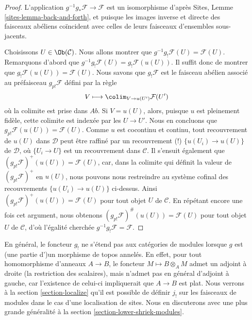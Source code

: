 \begin{proof}
L'application $g^{-1}g_*\mathcal{F} \to \mathcal{F}$ est un isomorphisme
d'après Sites, Lemme \ref{sites-lemma-back-and-forth}, et puisque les images
inverse et directe des faisceaux abéliens coïncident avec celles de leurs
faisceaux d'ensembles sous-jacents.

\medskip\noindent
Choisissons $U \in \Ob(\mathcal{C})$. Nous allons montrer que
$g^{-1}g_!\mathcal{F}(U) = \mathcal{F}(U)$. Remarquons d'abord que
$g^{-1}g_!\mathcal{F}(U) = g_!\mathcal{F}(u(U))$. Il suffit donc de montrer que
$g_!\mathcal{F}(u(U)) = \mathcal{F}(U)$. Nous savons que $g_!\mathcal{F}$ est
le faisceau abélien associé au préfaisceau $g_{p!}\mathcal{F}$ défini par la
règle
$$
V \longmapsto \colim_{V \to u(U')} \mathcal{F}(U')
$$
où la colimite est prise dans $\textit{Ab}$. Si $V = u(U)$, alors, puisque $u$
est pleinement fidèle, cette colimite est indexée par les $U \to U'$. Nous en
concluons que $g_{p!}\mathcal{F}(u(U)) = \mathcal{F}(U)$. Comme $u$ est
cocontinu et continu, tout recouvrement de $u(U)$ dans $\mathcal{D}$ peut être
raffiné par un recouvrement (!) $\{u(U_i) \to u(U)\}$ de $\mathcal{D}$, où
$\{U_i \to U\}$ est un recouvrement dans $\mathcal{C}$. Il s'ensuit également
que $(g_{p!}\mathcal{F})^+(u(U)) = \mathcal{F}(U)$, car, dans la colimite qui
définit la valeur de $(g_{p!}\mathcal{F})^+$ en $u(U)$, nous pouvons nous
restreindre au système cofinal des recouvrements
$\{u(U_i) \to u(U)\}$ ci-dessus. Ainsi
$(g_{p!}\mathcal{F})^+(u(U)) = \mathcal{F}(U)$ pour tout objet $U$ de
$\mathcal{C}$. En répétant encore une fois cet argument, nous obtenons
$(g_{p!}\mathcal{F})^\#(u(U)) = \mathcal{F}(U)$ pour tout objet $U$ de
$\mathcal{C}$, d'où l'égalité cherchée $g^{-1}g_!\mathcal{F} = \mathcal{F}$.
\end{proof}

\begin{remark}
\label{remark-no-extension}
En général, le foncteur $g_!$ ne s'étend pas aux catégories de modules lorsque
$g$ est (une partie d')un morphisme de topos annelés. En effet, pour tout
homomorphisme d'anneaux $A \to B$, le foncteur
$M \mapsto B \otimes_A M$ admet un adjoint à droite (la restriction des
scalaires), mais n'admet pas en général d'adjoint à gauche, car l'existence de
celui-ci impliquerait que $A \to B$ est plat. Nous verrons à la section
\ref{section-localize} qu'il est possible de définir $j_!$ sur les faisceaux de
modules dans le cas d'une localisation de sites. Nous en discuterons avec une
plus grande généralité à la section \ref{section-lower-shriek-modules}.
\end{remark}

